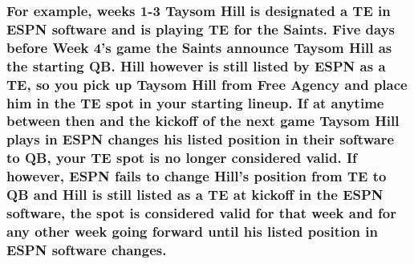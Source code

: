\documentclass[
]{book}
\begin{document}
\hypertarget{for-example-weeks-1-3-taysom-hill-is-designated-a-te-in-espn-software-and-is-playing-te-for-the-saints.-five-days-before-week-4s-game-the-saints-announce-taysom-hill-as-the-starting-qb.-hill-however-is-still-listed-by-espn-as-a-te-so-you-pick-up-taysom-hill-from-free-agency-and-place-him-in-the-te-spot-in-your-starting-lineup.-if-at-anytime-between-then-and-the-kickoff-of-the-next-game-taysom-hill-plays-in-espn-changes-his-listed-position-in-their-software-to-qb-your-te-spot-is-no-longer-considered-valid.-if-however-espn-fails-to-change-hills-position-from-te-to-qb-and-hill-is-still-listed-as-a-te-at-kickoff-in-the-espn-software-the-spot-is-considered-valid-for-that-week-and-for-any-other-week-going-forward-until-his-listed-position-in-espn-software-changes.}{%
\subsubsection{For example, weeks 1-3 Taysom Hill is designated a TE in ESPN software and is playing TE for the Saints. Five days before Week 4's game the Saints announce Taysom Hill as the starting QB. Hill however is still listed by ESPN as a TE, so you pick up Taysom Hill from Free Agency and place him in the TE spot in your starting lineup. If at anytime between then and the kickoff of the next game Taysom Hill plays in ESPN changes his listed position in their software to QB, your TE spot is no longer considered valid. If however, ESPN fails to change Hill's position from TE to QB and Hill is still listed as a TE at kickoff in the ESPN software, the spot is considered valid for that week and for any other week going forward until his listed position in ESPN software changes.}\label{for-example-weeks-1-3-taysom-hill-is-designated-a-te-in-espn-software-and-is-playing-te-for-the-saints.-five-days-before-week-4s-game-the-saints-announce-taysom-hill-as-the-starting-qb.-hill-however-is-still-listed-by-espn-as-a-te-so-you-pick-up-taysom-hill-from-free-agency-and-place-him-in-the-te-spot-in-your-starting-lineup.-if-at-anytime-between-then-and-the-kickoff-of-the-next-game-taysom-hill-plays-in-espn-changes-his-listed-position-in-their-software-to-qb-your-te-spot-is-no-longer-considered-valid.-if-however-espn-fails-to-change-hills-position-from-te-to-qb-and-hill-is-still-listed-as-a-te-at-kickoff-in-the-espn-software-the-spot-is-considered-valid-for-that-week-and-for-any-other-week-going-forward-until-his-listed-position-in-espn-software-changes.}}
\end{document}
